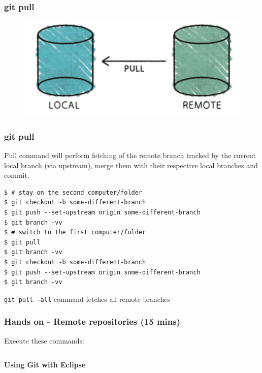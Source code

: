 \documentclass{beamer}
\begin{document}
\begin{frame}[fragile]
\frametitle{git pull}
\begin{figure}

  \includegraphics[scale=0.3]{figures/f7.png}
\end{figure}
\end{frame}

\begin{frame}[fragile]
\frametitle{git pull}

Pull command will perform fetching of the remote branch tracked by the
current local branch (via upstream), merge them with their
respective local branches and commit.


\begin{lstlisting}
$ # stay on the second computer/folder
$ git checkout -b some-different-branch
$ git push --set-upstream origin some-different-branch
$ git branch -vv
$ # switch to the first computer/folder
$ git pull
$ git branch -vv
$ git checkout -b some-different-branch
$ git push --set-upstream origin some-different-branch
$ git branch -vv
\end{lstlisting}

\texttt{git pull ---all} command fetches all remote branches

\end{frame}

\begin{frame}[fragile]
\frametitle{Hands on - Remote repositories (15 mins)}

Execute these commands:

\begin{lstlisting}
\end{lstlisting}
\end{frame}


\begin{frame}
\LARGE	
\textbf{Using Git with Eclipse}
\end{frame}
\end{document}
